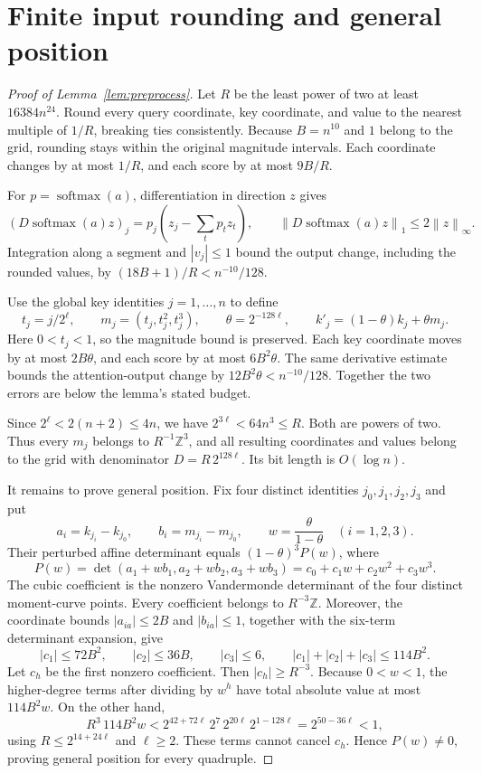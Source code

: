 \documentclass[notab,a4paper,UKenglish,numberwithinsect]{socg-lipics-v2021}
\newcommand{\Z}{\mathbb Z}
\newcommand{\norm}[1]{\left\lVert #1\right\rVert}
\begin{document}
\section{Finite input rounding and general position}\label{app:preprocess}
\begin{proof}[Proof of Lemma~\ref{lem:preprocess}]
Let $R$ be the least power of two at least $16384n^{24}$. Round every query coordinate, key coordinate, and value to the nearest multiple of $1/R$, breaking ties consistently. Because $B=n^{10}$ and $1$ belong to the grid, rounding stays within the original magnitude intervals. Each coordinate changes by at most $1/R$, and each score by at most $9B/R$.

For $p=\operatorname{softmax}(a)$, differentiation in direction $z$ gives
\[
 (D\operatorname{softmax}(a)z)_j
   =p_j\left(z_j-\sum_t p_tz_t\right),\qquad
 \norm{D\operatorname{softmax}(a)z}_1\le2\norm z_\infty.
\]
Integration along a segment and $|v_j|\le1$ bound the output change, including the rounded values, by $(18B+1)/R<n^{-10}/128$.

Use the global key identities $j=1,\ldots,n$ to define
\[
 t_j=j/2^\ell,\qquad m_j=(t_j,t_j^2,t_j^3),\qquad
 \theta=2^{-128\ell},\qquad k'_j=(1-\theta)k_j+\theta m_j.
\]
Here $0<t_j<1$, so the magnitude bound is preserved. Each key coordinate moves by at most $2B\theta$, and each score by at most $6B^2\theta$. The same derivative estimate bounds the attention-output change by $12B^2\theta<n^{-10}/128$. Together the two errors are below the lemma's stated budget.

Since $2^\ell<2(n+2)\le4n$, we have $2^{3\ell}<64n^3\le R$. Both are powers of two. Thus every $m_j$ belongs to $R^{-1}\Z^3$, and all resulting coordinates and values belong to the grid with denominator $D=R\,2^{128\ell}$. Its bit length is $O(\log n)$.

It remains to prove general position. Fix four distinct identities $j_0,j_1,j_2,j_3$ and put
\[
 a_i=k_{j_i}-k_{j_0},\qquad b_i=m_{j_i}-m_{j_0},\qquad
 w=\frac{\theta}{1-\theta}\quad(i=1,2,3).
\]
Their perturbed affine determinant equals $(1-\theta)^3 P(w)$, where
\[
 P(w)=\det(a_1+wb_1,a_2+wb_2,a_3+wb_3)
       =c_0+c_1w+c_2w^2+c_3w^3.
\]
The cubic coefficient is the nonzero Vandermonde determinant of the four distinct moment-curve points. Every coefficient belongs to $R^{-3}\Z$. Moreover, the coordinate bounds $|a_{ia}|\le2B$ and $|b_{ia}|\le1$, together with the six-term determinant expansion, give
\[
 |c_1|\le72B^2,\qquad |c_2|\le36B,\qquad |c_3|\le6,
 \qquad |c_1|+|c_2|+|c_3|\le114B^2.
\]
Let $c_h$ be the first nonzero coefficient. Then $|c_h|\ge R^{-3}$. Because $0<w<1$, the higher-degree terms after dividing by $w^h$ have total absolute value at most $114B^2w$. On the other hand,
\[
 R^3\,114B^2w
 <2^{42+72\ell}\,2^7\,2^{20\ell}\,2^{1-128\ell}
 =2^{50-36\ell}<1,
\]
using $R\le2^{14+24\ell}$ and $\ell\ge2$. These terms cannot cancel $c_h$. Hence $P(w)\ne0$, proving general position for every quadruple.


\end{proof}
\end{document}

